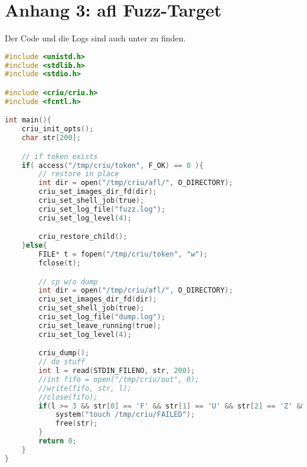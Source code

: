 \documentclass[a4paper]{article}
\begin{document}
\section*{Anhang 3: afl Fuzz-Target}

Der Code und die Logs sind auch unter  zu finden.

\begin{lstlisting}[caption=afl Fuzz-Target,language=C]
#include <unistd.h>
#include <stdlib.h>
#include <stdio.h>

#include <criu/criu.h>
#include <fcntl.h>

int main(){
	criu_init_opts();
	char str[200];

	// if token exists
	if( access("/tmp/criu/token", F_OK) == 0 ){
		// restore in place
		int dir = open("/tmp/criu/afl/", O_DIRECTORY);
		criu_set_images_dir_fd(dir);
		criu_set_shell_job(true);
		criu_set_log_file("fuzz.log");
		criu_set_log_level(4);

		criu_restore_child();
	}else{
		FILE* t = fopen("/tmp/criu/token", "w");
		fclose(t);

		// cp w/o dump
		int dir = open("/tmp/criu/afl/", O_DIRECTORY);
		criu_set_images_dir_fd(dir);
		criu_set_shell_job(true);
		criu_set_log_file("dump.log");
		criu_set_leave_running(true);
		criu_set_log_level(4);

		criu_dump();
		// do stuff
		int l = read(STDIN_FILENO, str, 200);
		//int fifo = open("/tmp/criu/out", 0);
		//write(fifo, str, l);
		//close(fifo);
		if(l >= 3 && str[0] == 'F' && str[1] == 'U' && str[2] == 'Z' && str[3] == 'Z'){
			system("touch /tmp/criu/FAILED");
			free(str);
		}
		return 0;
	}
}

\end{lstlisting}
\end{document}
